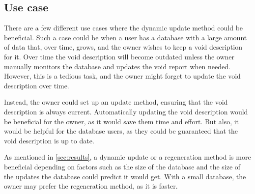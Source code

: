 \subsection{Use case}\label{subsec:use-case}
There are a few different use cases where the dynamic update method could be beneficial. Such a case could be when a user has a database with a large amount of data that, over time, grows, and the owner wishes to keep a \gls{void} description for it. Over time the \gls{void} description will become outdated unless the owner manually monitors the database and updates the \gls{void} report when needed. However, this is a tedious task, and the owner might forget to update the \gls{void} description over time.

Instead, the owner could set up an update method, ensuring that the \gls{void} description is always current. Automatically updating the \gls{void} description would be beneficial for the owner, as it would save them time and effort. But also, it would be helpful for the database users, as they could be guaranteed that the \gls{void} description is up to date.

As mentioned in \autoref{sec:results}, a dynamic update or a regeneration method is more beneficial depending on factors such as the size of the database and the size of the updates the database could predict it would get. With a small database, the owner may prefer the regeneration method, as it is faster.









